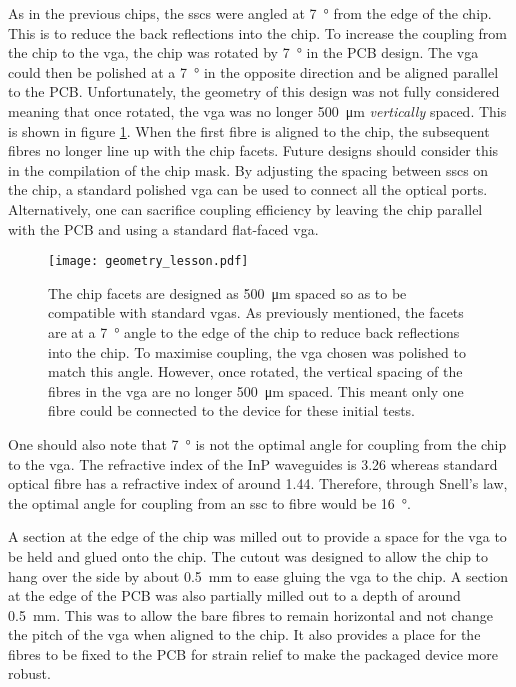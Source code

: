 As in the previous chips, the \acp{ssc} were angled at \SI{7}{\degree} from the edge of the chip. This is to reduce the back reflections into the chip. To increase the coupling from the chip to the \ac{vga}, the chip was rotated by \SI{7}{\degree} in the PCB design. The \ac{vga} could then be polished at a \SI{7}{\degree} in the opposite direction and be aligned parallel to the PCB. Unfortunately, the geometry of this design was not fully considered meaning that once rotated, the \ac{vga} was no longer \SI{500}{\um} \textit{vertically} spaced. This is shown in figure \ref{fig:geometry_lesson}. When the first fibre is aligned to the chip, the subsequent fibres no longer line up with the chip facets. Future designs should consider this in the compilation of the chip mask. By adjusting the spacing between \acp{ssc} on the chip, a standard polished \ac{vga} can be used to connect all the optical ports. Alternatively, one can sacrifice coupling efficiency by leaving the chip parallel with the PCB and using a standard flat-faced \ac{vga}.


\begin{figure}[t]
	\centering
	\texttt{[image: geometry\_lesson.pdf]}
	\caption[A quick lesson in geometry for edge coupling]{The chip facets are designed as \SI{500}{\um} spaced so as to be compatible with standard \acsp{vga}. As previously mentioned, the facets are at a \SI{7}{\degree} angle to the edge of the chip to reduce back reflections into the chip. To maximise coupling, the \acs{vga} chosen was polished to match this angle. However, once rotated, the vertical spacing of the fibres in the \acs{vga} are no longer \SI{500}{\um} spaced. This meant only one fibre could be connected to the device for these initial tests.}
	\label{fig:geometry_lesson}
\end{figure}

One should also note that \SI{7}{\degree} is not the optimal angle for coupling from the chip to the \ac{vga}. The refractive index of the \ac{InP} waveguides is 3.26 whereas standard optical fibre has a refractive index of around 1.44. Therefore, through Snell's law, the optimal angle for coupling from an \ac{ssc} to fibre would be \SI{16}{\degree}. 

A section at the edge of the chip was milled out to provide a space for the \ac{vga} to be held and glued onto the chip. The cutout was designed to allow the chip to hang over the side by about \SI{0.5}{\mm} to ease gluing the \ac{vga} to the chip. A section at the edge of the PCB was also partially milled out to a depth of around \SI{0.5}{\mm}. This was to allow the bare fibres to remain horizontal and not change the pitch of the \ac{vga} when aligned to the chip. It also provides a place for the fibres to be fixed to the PCB for strain relief to make the packaged device more robust.

